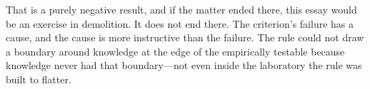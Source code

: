 That is a purely negative result, and if the matter ended there, this essay would be an exercise in demolition. It does not end there. The criterion's failure has a cause, and the cause is more instructive than the failure. The rule could not draw a boundary around knowledge at the edge of the empirically testable because knowledge never had that boundary---not even inside the laboratory the rule was built to flatter.
